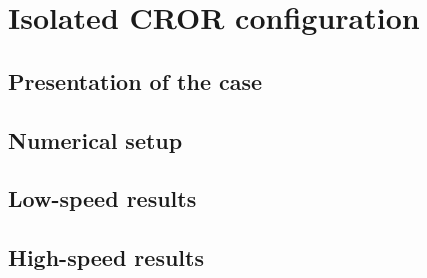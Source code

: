 \chapter{Isolated CROR configuration}
\label{cha:dream_isolated}

\chabstract{}

\minitoc
\newpage

\section{Presentation of the case}
\label{sec:dream_presentation}


\section{Numerical setup}
\label{sec:dream_numerical}


\section{Low-speed results}
\label{sec:dream_steady_results}


\section{High-speed results}
\label{sec:dream_unsteady_rigid_results}


\chconclu{}
